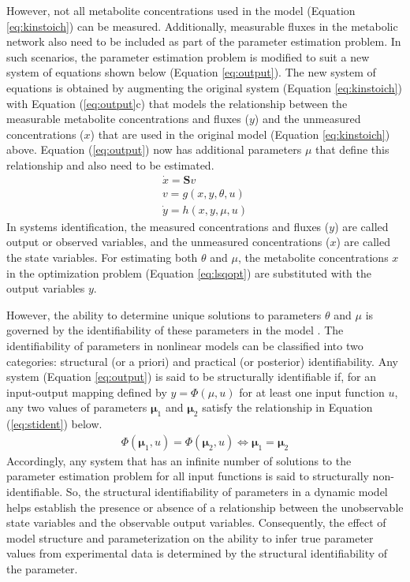 \documentclass[10pt]{article}
\begin{document}
However, not all metabolite concentrations used in the model (Equation \ref{eq:kinstoich}) can be measured. Additionally, measurable fluxes in the metabolic network also need to be included as part of the parameter estimation problem. In such scenarios, the parameter estimation problem is modified to suit a new system of equations shown below (Equation \ref{eq:output}). The new system of equations is obtained by augmenting the original system (Equation \ref{eq:kinstoich}) with Equation (\ref{eq:output}c) that models the relationship between the measurable metabolite concentrations and fluxes ($y$) and the unmeasured concentrations ($x$) that are used in the original model (Equation \ref{eq:kinstoich}) above. Equation (\ref{eq:output}) now has additional parameters $\mu$ that define this relationship and also need to be estimated.
\begin{subequations}\label{eq:output}
	\begin{align}
	\dot{x} = \mathbf{S}v\\
	v = g(x, y, \theta, u)\\
	\dot{y} = h(x, y, \mu, u)
	\end{align}
\end{subequations}
In systems identification, the measured concentrations and fluxes ($y$) are called output or observed variables, and the unmeasured concentrations ($x$) are called the state variables. For estimating both $\theta$ and $\mu$, the metabolite concentrations $x$ in the optimization problem (Equation \ref{eq:lsqopt}) are substituted with the output variables $y$. 

However, the ability to determine unique solutions to parameters $\theta$ and $\mu$ is governed by the identifiability of these parameters in the model \parencite{McLean2012}. The identifiability of parameters in nonlinear models can be classified into two categories: structural (or a priori) and practical (or posterior) identifiability. 	
Any system (Equation \ref{eq:output}) is said to be structurally identifiable if, for an input-output mapping defined by $y = \Phi(\mu,u)$ for at least one input function $u$, any two values of parameters $\mathbf{\mu}_1$ and $\mathbf{\mu}_2$ satisfy the relationship in Equation (\ref{eq:stident}) below.
\begin{align}\label{eq:stident}
\Phi(\mathbf{\mu}_1,u) = \Phi(\mathbf{\mu}_2,u) \iff \mathbf{\mu}_1 = \mathbf{\mu}_2
\end{align}
Accordingly, any system that has an infinite number of solutions to the parameter estimation problem for all input functions is said to structurally non-identifiable. So, the structural identifiability of parameters in a dynamic model helps establish the presence or absence of a relationship between the unobservable state variables and the observable output variables. Consequently, the effect of model structure and parameterization on the ability to infer true parameter values from experimental data is determined by the structural identifiability of the parameter. 
\end{document}

